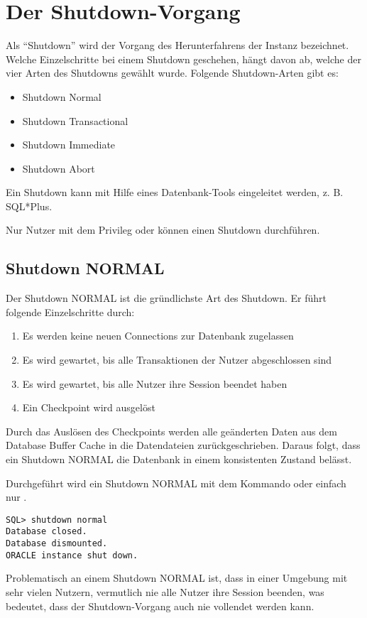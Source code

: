     \section{Der Shutdown-Vorgang}
      Als \enquote{Shutdown} wird der Vorgang des Herunterfahrens der Instanz bezeichnet. Welche Einzelschritte bei einem Shutdown geschehen, h\"angt davon ab, welche der vier Arten des Shutdowns gew\"ahlt wurde. Folgende Shutdown-Arten gibt es:
      \begin{itemize}
        \item Shutdown Normal
        \item Shutdown Transactional
        \item Shutdown Immediate
        \item Shutdown Abort
      \end{itemize}
      Ein Shutdown kann mit Hilfe eines Datenbank-Tools eingeleitet werden, z. B. SQL*Plus.
      \begin{merke}
        Nur Nutzer mit dem Privileg  oder  k\"onnen einen Shutdown durchf\"uhren.
      \end{merke}
      \subsection{Shutdown NORMAL}
        Der Shutdown NORMAL ist die gr\"undlichste Art des Shutdown. Er f\"uhrt folgende Einzelschritte durch:
        \begin{enumerate}
          \item Es werden keine neuen Connections zur Datenbank zugelassen
          \item Es wird gewartet, bis alle Transaktionen der Nutzer abgeschlossen sind
          \item Es wird gewartet, bis alle Nutzer ihre Session beendet haben
          \item Ein Checkpoint wird ausgel\"ost
        \end{enumerate}
        Durch das Ausl\"osen des Checkpoints werden alle ge\"anderten Daten aus dem Database Buffer Cache in die Datendateien zur\"uckgeschrieben. Daraus folgt, dass ein Shutdown NORMAL die Datenbank in einem konsistenten Zustand bel\"asst.

        Durchgef\"uhrt wird ein Shutdown NORMAL mit dem Kommando
        oder einfach nur .
        \begin{lstlisting}[caption={Durchf\"uhren eines Shutdown
        NORMAL},label=admin08,language=sqlplus]
SQL> shutdown normal
Database closed.
Database dismounted.
ORACLE instance shut down.
        \end{lstlisting}
         \begin{merke}
           Problematisch an einem Shutdown NORMAL ist, dass in einer Umgebung mit sehr vielen Nutzern, vermutlich nie alle Nutzer ihre Session beenden, was bedeutet, dass der Shutdown-Vorgang auch nie vollendet werden kann.
         \end{merke}
